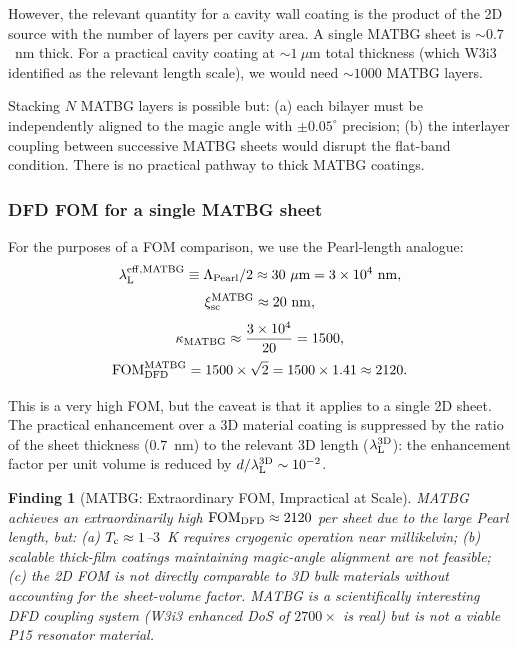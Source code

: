 \documentclass[11pt]{article}
\newtheorem{finding}{Finding}
\newcommand{\ee}[1]{\times 10^{#1}}
\newcommand{\lambdaL}{\lambda_{\rm L}}
\newcommand{\xsc}{\xi_{\rm sc}}
\newcommand{\Tc}{T_{\rm c}}
\newcommand{\FOM}{\mathrm{FOM}}
\begin{document}
However, the relevant quantity for a cavity wall coating is the product
of the 2D source with the number of layers per cavity area. A single MATBG
sheet is $\sim 0.7$~nm thick. For a practical cavity coating at
$\sim 1~\mu$m total thickness (which W3i3 identified as the relevant
length scale), we would need $\sim 1000$ MATBG layers.

Stacking $N$ MATBG layers is possible but: (a) each bilayer must be
independently aligned to the magic angle with $\pm 0.05^\circ$ precision;
(b) the interlayer coupling between successive MATBG sheets would disrupt
the flat-band condition. There is no practical pathway to thick MATBG
coatings.

\subsubsection{DFD FOM for a single MATBG sheet}

For the purposes of a FOM comparison, we use the Pearl-length analogue:
\begin{equation}
\lambdaL^{\rm eff,MATBG} \equiv \Lambda_{\rm Pearl}/2 \approx 30~\mu{\rm m}
= 3\ee{4}~{\rm nm},
\end{equation}
\begin{equation}
\xsc^{\rm MATBG} \approx 20~{\rm nm},
\end{equation}
\begin{equation}
\kappa_{\rm MATBG} \approx \frac{3\ee{4}}{20} = 1500,
\end{equation}
\begin{equation}
\FOM_{\rm DFD}^{\rm MATBG}
= 1500 \times \sqrt{2}
= 1500 \times 1.41
\approx 2120.
\label{eq:fom-matbg}
\end{equation}

This is a very high FOM, but the caveat is that it applies to a single
2D sheet. The practical enhancement over a 3D material coating is suppressed
by the ratio of the sheet thickness ($0.7$~nm) to the relevant 3D length
($\lambdaL^{\rm 3D}$): the enhancement factor per unit volume is reduced by
$d/\lambdaL^{\rm 3D} \sim 10^{-2}$.

\begin{finding}[MATBG: Extraordinary FOM, Impractical at Scale]
\label{finding:matbg}
MATBG achieves an extraordinarily high $\FOM_{\rm DFD} \approx 2120$ per
sheet due to the large Pearl length, but:
(a) $\Tc \approx 1$--$3$~K requires cryogenic operation near millikelvin;
(b) scalable thick-film coatings maintaining magic-angle alignment are
not feasible;
(c) the 2D FOM is not directly comparable to 3D bulk materials without
accounting for the sheet-volume factor.
MATBG is a scientifically interesting DFD coupling system (W3i3 enhanced
DoS of $2700\times$ is real) but is not a viable P15 resonator material.
\end{finding}
\end{document}
